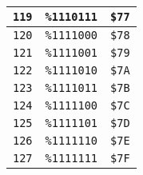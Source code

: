 \begin{multicols}{2}
\begin{center}
\begin{tabular}{|c|c|c|}
 \texttt{119} & \texttt{\%1110111} &  \texttt{\$77} \\ \hline
 \texttt{120} & \texttt{\%1111000} &  \texttt{\$78} \\ \hline
 \texttt{121} & \texttt{\%1111001} &  \texttt{\$79} \\ \hline
 \texttt{122} & \texttt{\%1111010} &  \texttt{\$7A} \\ \hline
 \texttt{123} & \texttt{\%1111011} &  \texttt{\$7B} \\ \hline
 \texttt{124} & \texttt{\%1111100} &  \texttt{\$7C} \\ \hline
 \texttt{125} & \texttt{\%1111101} &  \texttt{\$7D} \\ \hline
 \texttt{126} & \texttt{\%1111110} &  \texttt{\$7E} \\ \hline
 \texttt{127} & \texttt{\%1111111} &  \texttt{\$7F} \\ \hline
		\end{tabular}
	\end{center}
\end{multicols}

\vspace*{\fill}

\clearpage

\vspace*{\fill}

